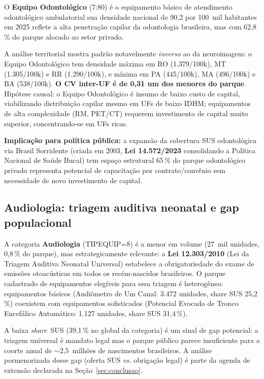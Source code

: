 \documentclass[12pt,a4paper,oneside]{article}
\begin{document}
O \textbf{Equipo Odontológico} (7{:}80) é o equipamento básico de
atendimento odontológico ambulatorial \textemdash{} sua densidade
nacional de 90,2 por 100~mil habitantes em 2025 reflete a alta
penetração capilar da odontologia brasileira, mas com 62,8\,\% do
parque alocado ao setor privado.

A análise territorial mostra padrão notavelmente \textit{inverso}
ao da neuroimagem: o Equipo Odontológico tem densidade máxima em
RO (1.379/100k), MT (1.305/100k) e RR (1.290/100k), e mínima em PA
(445/100k), MA (496/100k) e BA (538/100k). \textbf{O CV inter-UF é
de 0,31 \textemdash{} um dos menores do parque}. Hipótese causal:
o Equipo Odontológico é insumo de baixo custo de capital, viabilizando
distribuição capilar mesmo em UFs de baixo IDHM; equipamentos de
alta complexidade (RM, PET/CT) requerem investimento de capital muito
superior, concentrando-se em UFs ricas.

\textbf{Implicação para política pública:} a expansão da cobertura
SUS odontológica via Brasil Sorridente (criada em 2003,
\textbf{Lei 14.572/2023} consolidando a Política Nacional de Saúde
Bucal) tem espaço estrutural \textemdash{} 65\,\% do parque
odontológico privado representa potencial de capacitação por
contrato/convênio sem necessidade de novo investimento de capital.

\subsection{Audiologia: triagem auditiva neonatal e gap
populacional}\label{sub:audiologia}

A categoria \textbf{Audiologia} (TIPEQUIP=8) é a menor em volume
(27~mil unidades, 0,8\,\% do parque), mas estrategicamente
relevante: a \textbf{Lei 12.303/2010} (Lei da Triagem Auditiva
Neonatal Universal) estabelece a obrigatoriedade do exame de
emissões otoacústicas em todos os recém-nascidos brasileiros. O
parque cadastrado de equipamentos elegíveis para essa triagem é
heterogêneo: equipamentos básicos (Audiômetro de Um Canal: 3.472
unidades, share SUS 25,2\,\%) coexistem com equipamentos
sofisticados (Potencial Evocado de Tronco Encefálico Automático:
1.127 unidades, share SUS 31,4\,\%).

A baixa \textit{share}~SUS (39,1\,\% no global da categoria) é
um sinal de gap potencial: a triagem universal é mandato legal mas
o parque público parece insuficiente para a coorte anual de
$\sim$2,5~milhões de nascimentos brasileiros. A análise pormenorizada
desse gap (oferta SUS \textit{vs.} obrigação legal) é parte da agenda
de extensão declarada na Seção~\ref{sec:conclusao}.
\end{document}
